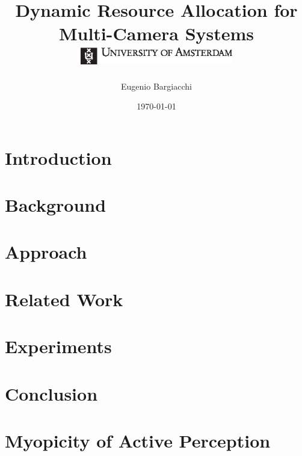 \documentclass[10pt,twoside]{report}
\title{
    {Dynamic Resource Allocation for Multi-Camera Systems}\\\vspace{1cm}
    {\includegraphics[width=0.5\textwidth]{UvA-logo}}
}
\author{Eugenio Bargiacchi}
\date{\today}
\begin{document}
\maketitle


\tableofcontents

\chapter{Introduction}\label{ref:intro}


\chapter{Background}\label{ref:background}



\chapter{Approach}\label{ref:approach}


\chapter{Related Work}\label{ref:relwork}


\chapter{Experiments}\label{ref:experiments}


\chapter{Conclusion}\label{ref:conclusion}


\nocite{*}
\appendix

\chapter{Myopicity of Active Perception}\label{ref:appendix_proof}




\end{document}
